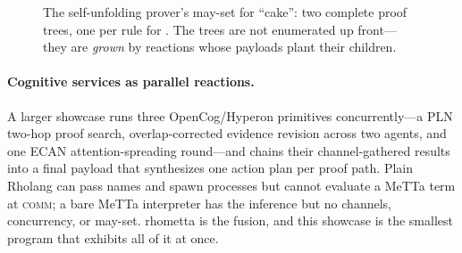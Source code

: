 \begin{figure}[h]\centering
{}
\caption{The self-unfolding prover's may-set for ``cake'': two complete proof
  trees, one per rule for .  The trees are not enumerated up front---%
  they are \emph{grown} by reactions whose payloads plant their children.}
\label{fig:cake}
\end{figure}

\paragraph{Cognitive services as parallel reactions.}  A larger showcase runs
three OpenCog/Hyperon primitives concurrently---a PLN two-hop proof search,
overlap-corrected evidence revision across two agents, and one ECAN
attention-spreading round---and chains their channel-gathered results into a
final payload that synthesizes one action plan per proof path.  Plain Rholang can
pass names and spawn processes but cannot evaluate a MeTTa term at \textsc{comm};
a bare MeTTa interpreter has the inference but no channels, concurrency, or
may-set.  rhometta is the fusion, and this showcase is the smallest program that
exhibits all of it at once.

